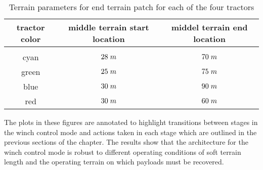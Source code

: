 \begin{table}[htbp]
\caption{Terrain parameters for end terrain patch for each of the four tractors}
\label{table:loc_terrain_4tractors_WC}
\begin{center}
\vspace{-5mm}
\begin{tabular}{ |c|c|c| } 
 \hline
 tractor color & middle terrain start location & middel terrain end location \\ 
 \hline
  \vspace{-1.4mm} & \vspace{-1.4mm} & \vspace{-1.4mm}  \\ 
 \hline
 cyan & $28\hspace{1mm}m$ & $70\hspace{1mm}m$ \\ 
 \hline
 green & $25\hspace{1mm}m$ & $75\hspace{1mm}m$  \\ 
 \hline
 blue & $30\hspace{1mm}m$ & $90\hspace{1mm}m$ \\ 
 \hline
 red & $30\hspace{1mm}m$ & $60\hspace{1mm}m$  \\ 
 \hline
\end{tabular}
\end{center}
\end{table}
The plots in these figures are annotated to highlight transitions between stages in the winch control mode and actions taken in each stage which are outlined in the previous sections of the chapter. The results show that the architecture for the winch control mode is robust to different operating conditions of soft terrain length and the operating terrain on which payloads must be recovered.


